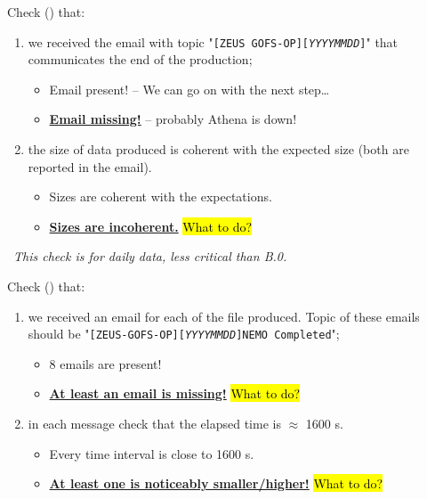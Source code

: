 \documentclass[twocolumn,8pt]{article}
\begin{document}
\begin{mdframed}[frametitle=(B.1)\ -- At 9 am\hfill\faSunO]

Check (\faEnvelope) that:

\begin{enumerate}\itemsep0pt
    \item we received the email with topic "\texttt{[ZEUS GOFS-OP][\textit{YYYYMMDD}]}" that communicates the end of the production;
    \begin{itemize}\itemsep0pt
        \item[{\textcolor{ForestGreen}{\faCheckCircle}}] Email present! -- We can go on with the next step\dots
        \item[{\textcolor{Red}{\faTimesCircle}}] \ul{\textbf{Email missing!}} -- probably Athena is down!
    \end{itemize}
    \item the size of data produced is coherent with the expected size (both are reported in the email).
    \begin{itemize}\itemsep0pt
        \item[{\textcolor{ForestGreen}{\faCheckCircle}}] Sizes are coherent with the expectations.
        \item[{\textcolor{Red}{\faTimesCircle}}] \ul{\textbf{Sizes are incoherent.}} \hl{What to do?}
    \end{itemize}
\end{enumerate}

\faInfoCircle\ \textit{This check is for daily data, less critical than B.0.}

\end{mdframed}    

\begin{mdframed}[frametitle=(B.2)\ -- At 9 am\hfill\faSunO]

Check (\faEnvelope) that:

\begin{enumerate}\itemsep0pt
    \item we received an email for each of the file produced. Topic of these emails should be "\texttt{[ZEUS-GOFS-OP][\textit{YYYYMMDD}]NEMO Completed}";
        \begin{itemize}\itemsep0pt
        \item[{\textcolor{ForestGreen}{\faCheckCircle}}] 8 emails are present!
        \item[{\textcolor{Red}{\faTimesCircle}}] \ul{\textbf{At least an email is missing!}} \hl{What to do?}
        \end{itemize}
    \item in each message check that the elapsed time is $\approx$ 1600 s.
        \begin{itemize}\itemsep0pt
        \item[{\textcolor{ForestGreen}{\faCheckCircle}}] Every time interval is close to 1600 s.
        \item[{\textcolor{Red}{\faTimesCircle}}] \ul{\textbf{At least one is noticeably smaller/higher!}} \hl{What to do?}
        \end{itemize}
\end{enumerate}
\end{mdframed}    
\end{document}
